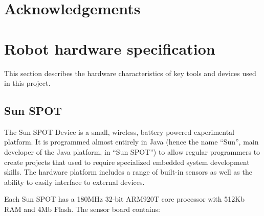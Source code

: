 \documentclass[a4paper,10pt]{article} %
\begin{document}

\section{Acknowledgements} %



\pagebreak

\appendix

\section{Robot hardware specification} %
\label{app:robot-hardware}

This section describes the hardware characteristics of key tools and devices
used in this project.

\subsection{Sun SPOT} %
\label{app:Sun SPOT}

The Sun SPOT Device is a small, wireless, battery powered experimental platform.
It is programmed almost entirely in Java (hence the name ``Sun'', main developer
of the Java platform, in ``Sun SPOT'') to allow regular programmers to create
projects that used to require specialized embedded system development skills.
The hardware platform includes a range of built-in sensors as well as the
ability to easily interface to external devices.

Each Sun SPOT has a 180MHz 32-bit ARM920T core processor with 512Kb RAM and 4Mb
Flash. The sensor board contains:
\end{document}
